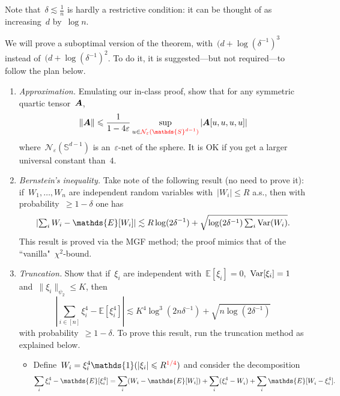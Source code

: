\documentclass[11pt]{article}
\newcommand{\odima}[1]{{\color{red} #1}}
\newcommand{\E}{\mathds{E}}
\newcommand{\cN}{\mathcal{N}}
\newcommand{\Var}{\textup{Var}}
\newcommand{\Sphere}{\mathds{S}}
\newcommand{\veps}{\varepsilon}
\newcommand{\lsim}{\lesssim}
\newcommand{\leqs}{\leqslant}
\newcommand{\geqs}{\geqslant}
\renewcommand{\le}{\leqs}
\renewcommand{\ge}{\geqs}
\begin{document}
\odima{Note that~$\delta \lsim \frac{1}{n}$ is hardly a restrictive condition: it can be thought of as increasing~$d$ by~$\log n$.}

We will prove a suboptimal version of the theorem, with~$(d + \log(\delta^{-1})^3$ instead of~$(d + \log(\delta^{-1})^2$. 
To do it, it is suggested---but not required---to follow the plan below. 

\begin{enumerate}
\item {\em Approximation.} 
Emulating our in-class proof, show that for any symmetric quartic tensor~$\boldsymbol{A}$, 
\[
\| \bA \| \le \frac{1}{1-4\veps} \sup_{u \in \odima{\cN_\veps(\Sphere^{d-1})}} |\bA[u,u,u,u]|
\]
\odima{where~$\cN_{\veps}(\Sphere^{d-1})$ is an~$\veps$-net of the sphere.
It is OK if you get a larger universal constant than~$4$.}

\item {\em Bernstein's inequality.}
Take note of the following result (no need to prove it): if~$W_1, \dots, W_n$ are independent random variables with~$|W_i| \le R$ a.s., 
then with probability~$\ge 1-\delta$ one has
\[
\left| \textstyle\sum_{i} W_i - \E[W_i] \right|
\lsim R\log(2\delta^{-1}) + \sqrt{\log(2\delta^{-1}) \textstyle\sum_{i} \Var(W_i)}.
\]
This result is proved via the MGF method; the proof mimics that of the ``vanilla"~$\chi^2$-bound.

\item {\em Truncation.} 
Show that if~$\xi_i$ are independent with~$\E[\xi_i] = 0$,~$\Var[\xi_i] = 1$ and~$\|\xi_i\|_{\psi_2} \le K$, then
\begin{equation}
\label{eq:quartic-sum-deviations}
\left| \textstyle\sum_{i \in [n]} \xi_i^4 - \E[\xi_i^4] \right| 
\lsim 
K^4 \log^3(2n\delta^{-1}) + \sqrt{n\log(2\delta^{-1})}
\end{equation}
with probability~$\ge 1-\delta$.
To prove this result, run the truncation method as explained below.
\begin{itemize}
\item Define~$W_i = \xi_i^4 \mathds{1}(|\xi_i| \le R^{\odima{1/4}})$ and
\odima{
consider the decomposition
\[
\sum_{i} \xi_i^4 - \E[\xi_i^4] 
= \sum_i (W_i - \E[W_i]) + \sum_i (\xi_i^4 - W_i^{\vphantom 4}) + \sum_i \E [W_i^{\vphantom 4} - \xi_i^4].
\]
}


\end{itemize}
\end{enumerate}
\end{document}

